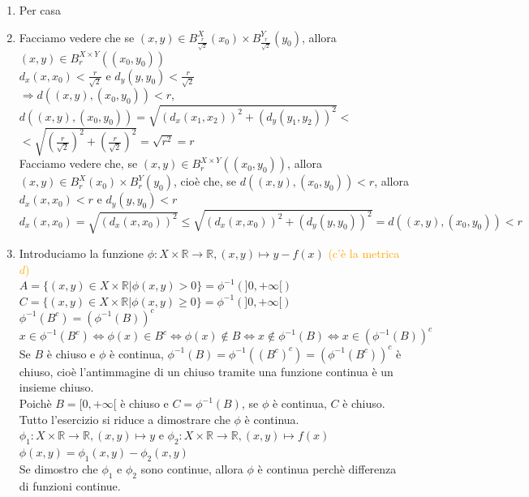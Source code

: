\documentclass{article}
\newcommand{\R}{\mathbb{R}}
\begin{document}
\begin{enumerate}
    \item Per casa
    \item Facciamo vedere che se $(x,y)\in B_{\frac{r}{\sqrt{2}}}^{X}(x_0) \times B_{\frac{r}{\sqrt{2}}}^{Y}(y_0)$, allora $(x,y) \in B_{r}^{X\times Y}((x_0,y_0))$\\
    $d_x(x,x_0)< \frac{r}{\sqrt{2}}$ e $d_y(y,y_0)< \frac{r}{\sqrt{2}}$\\
    $\Rightarrow d((x,y),(x_0,y_0))<r$, $d((x,y),(x_0,y_0))=\sqrt{(d_x(x_1,x_2))^2+(d_y(y_1,y_2))^2} <$\\
    $< \sqrt{\left( \frac{r}{\sqrt{2}} \right)^2+\left( \frac{r}{\sqrt{2}} \right)^2} = \sqrt{r^2} =r$\\
    Facciamo vedere che, se $(x,y)\in B_{r}^{X\times Y}((x_0,y_0))$, allora $(x,y)\in B_{r}^{X}(x_0) \times B_{r}^{Y}(y_0)$, cioè che, se $d((x,y),(x_0,y_0))<r$, allora $d_x(x,x_0)<r$ e $d_y(y,y_0)<r$\\
    $d_x(x,x_0)= \sqrt{(d_x(x,x_0))^2}\leq \sqrt{(d_x(x,x_0))^2+(d_y(y,y_0))^2}= d((x,y),(x_0,y_0))<r$
    \item Introduciamo la funzione $\phi: X\times\R \rightarrow \R, (x,y)\mapsto y-f(x)$ \textcolor{orange}{(c'è la metrica $d$)}\\
    $A= \{ (x,y)\in X\times\R | \phi(x,y)>0\} = \phi^{-1}(]0,+\infty[)$\\
    $C = \{ (x,y)\in X\times\R | \phi(x,y)\geq 0\} = \phi^{-1}(]0,+\infty[)$\\
    $\phi^{-1}(B^c)=(\phi^{-1}(B))^c$\\
    $x \in \phi^{-1}(B^c) \Leftrightarrow \phi(x)\in B^c \Leftrightarrow \phi(x)\notin B \Leftrightarrow x \notin \phi^{-1}(B) \Leftrightarrow x \in (\phi^{-1}(B))^c$\\
    Se $B$ è chiuso e $\phi$ è continua, $\phi^{-1} (B) = \phi^{-1}((B^c)^c)=(\phi^{-1}(B^c))^c$ è chiuso, cioè l'antimmagine di un chiuso tramite una funzione continua è un insieme chiuso.\\
    Poichè $B= [0,+\infty[$ è chiuso e $C= \phi^{-1}(B)$, se $\phi$ è continua, $C$ è chiuso.\\
    Tutto l'esercizio si riduce a dimostrare che $\phi$ è continua.\\
    $\phi_1: X \times \R \rightarrow \R, (x,y)\mapsto y$ e $\phi_2: X\times\R \rightarrow \R, (x,y)\mapsto f(x)$\\
    $\phi(x,y)=\phi_1(x,y)-\phi_2(x,y)$\\
    Se dimostro che $\phi_1$ e $\phi_2$ sono continue, allora $\phi$ è continua perchè differenza di funzioni continue.\\

\end{enumerate}
\end{document}
